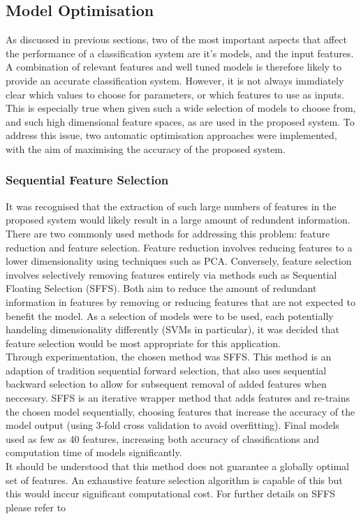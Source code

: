 \documentclass[titlepage, 12pt]{scrartcl} \usepackage{enumitem}
\begin{document}

\subsection{Model Optimisation}\label{optimise}
As discussed in previous sections, two of the most important aspects that affect
the performance of a classification system are it's models, and the input
features. A combination of relevant features and well tuned models is therefore
likely to provide an accurate classification system. However, it is not always
immdiately clear which values to choose for parameters, or which features to use as
inputs. This is especially true when given such a wide selection of models to
choose from, and such high dimensional feature spaces, as are used in the
proposed system. To address this issue, two automatic optimisation approaches
were implemented, with the aim of maximising the accuracy of the proposed
system.

\subsubsection{Sequential Feature Selection}\label{SFS}
It was recognised that the extraction of such large numbers of features in the
proposed system would likely result in a large amount of redundent information.
There are two commonly used methods for addressing this problem: feature
reduction and feature selection. Feature reduction involves reducing features
to a lower dimensionality using techniques such as PCA. Conversely, feature
selection involves selectively removing features entirely via methods such as
Sequential Floating Selection (SFFS). Both aim to reduce the amount of
redundant information in features by removing or reducing features that are not
expected to benefit the model. As a selection of models were to be used, each
potentially handeling dimensionality differently (SVMs in particular), it was
decided that feature selection would be most appropriate for this
application.\\

Through experimentation, the chosen method was SFFS. This method is an adaption
of tradition sequential forward selection, that also uses sequential backward
selection to allow for subsequent removal of added features when neccesary.
SFFS is an iterative wrapper method that adds features and re-trains the chosen
model sequentially, choosing features that increase the accuracy of the model
output (using 3-fold cross validation to avoid overfitting). Final models used
as few as 40 features, increasing both accuracy of classifications and
computation time of models significantly.\\
It should be understood that this method does not guarantee a globally optimal
set of features. An exhaustive feature selection algorithm is capable of this
but this would inccur significant computational cost. For further details on
SFFS please refer to~\parencite[p.3]{Ferri1994}
\end{document}
